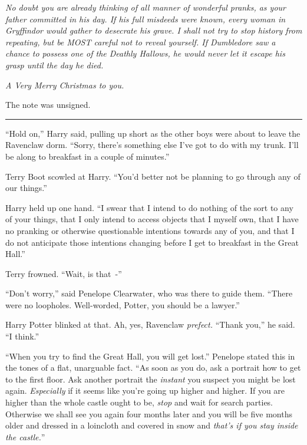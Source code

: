 \emph{No doubt you are already thinking of all manner of wonderful pranks, as your father committed in his day. If his full misdeeds were known, every woman in Gryffindor would gather to desecrate his grave. I shall not try to stop history from repeating, but be MOST careful not to reveal yourself. If Dumbledore saw a chance to possess one of the Deathly Hallows, he would never let it escape his grasp until the day he died.}

\emph{A Very Merry Christmas to you.}

The note was unsigned.

\begin{center}\rule{3in}{0.4pt}\end{center}

``Hold on,'' Harry said, pulling up short as the other boys were about to leave the Ravenclaw dorm. ``Sorry, there's something else I've got to do with my trunk. I'll be along to breakfast in a couple of minutes.''

Terry Boot scowled at Harry. ``You'd better not be planning to go through any of our things.''

Harry held up one hand. ``I swear that I intend to do nothing of the sort to any of your things, that I only intend to access objects that I myself own, that I have no pranking or otherwise questionable intentions towards any of you, and that I do not anticipate those intentions changing before I get to breakfast in the Great Hall.''

Terry frowned. ``Wait, is that~-''

``Don't worry,'' said Penelope Clearwater, who was there to guide them. ``There were no loopholes. Well-worded, Potter, you should be a lawyer.''

Harry Potter blinked at that. Ah, yes, Ravenclaw \emph{prefect.} ``Thank you,'' he said. ``I think.''

``When you try to find the Great Hall, you will get lost.'' Penelope stated this in the tones of a flat, unarguable fact. ``As soon as you do, ask a portrait how to get to the first floor. Ask another portrait the \emph{instant} you suspect you might be lost again. \emph{Especially} if it seems like you're going up higher and higher. If you are higher than the whole castle ought to be, \emph{stop} and wait for search parties. Otherwise we shall see you again four months later and you will be five months older and dressed in a loincloth and covered in snow and \emph{that's if you stay inside the castle.}''

